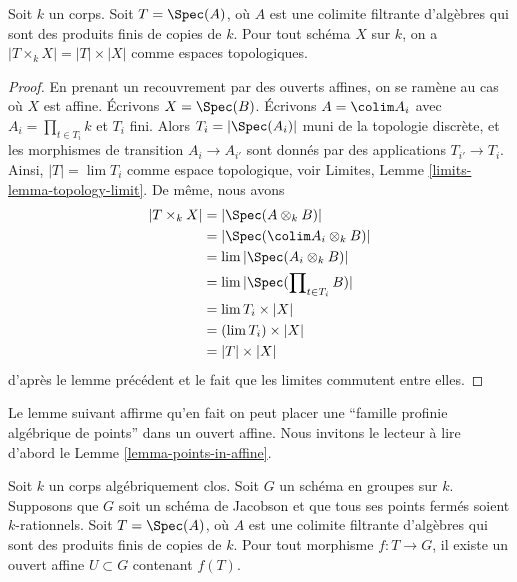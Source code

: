 \begin{lemma}
\label{lemma-profinite-product-over-field}
Soit $k$ un corps. Soit $T = \Spec(A)$, où $A$ est une colimite filtrante
d'algèbres qui sont des produits finis de copies de $k$. Pour tout schéma $X$
sur $k$, on a $|T \times_k X| = |T| \times |X|$ comme espaces topologiques.
\end{lemma}

\begin{proof}
En prenant un recouvrement par des ouverts affines, on se ramène au cas où $X$ est affine.
Écrivons $X = \Spec(B)$.
Écrivons $A = \colim A_i$ avec $A_i = \prod_{t \in T_i} k$ et $T_i$ fini.
Alors $T_i = |\Spec(A_i)|$ muni de la topologie discrète, et les morphismes
de transition $A_i \to A_{i'}$ sont donnés par des applications $T_{i'} \to T_i$. Ainsi,
$|T| = \lim T_i$ comme espace topologique, voir
Limites, Lemme \ref{limits-lemma-topology-limit}. De même, nous avons
\begin{align*}
|T \times_k X| & =
|\Spec(A \otimes_k B)| \\
& =
|\Spec(\colim A_i \otimes_k B)| \\
& =
\lim |\Spec(A_i \otimes_k B)| \\
& =
\lim |\Spec(\prod\nolimits_{t \in T_i} B)| \\
& =
\lim T_i \times |X| \\
& =
(\lim T_i) \times |X| \\
& =
|T| \times |X|
\end{align*}
d'après le lemme précédent et le fait que les limites commutent entre elles.
\end{proof}

\noindent
Le lemme suivant affirme qu'en fait on peut placer une
``famille profinie algébrique de points'' dans un ouvert affine.
Nous invitons le lecteur à lire d'abord le Lemme \ref{lemma-points-in-affine}.

\begin{lemma}
\label{lemma-compact-set-in-affine}
Soit $k$ un corps algébriquement clos. Soit $G$ un schéma en groupes sur $k$.
Supposons que $G$ soit un schéma de Jacobson et que tous ses points fermés soient $k$-rationnels.
Soit $T = \Spec(A)$, où $A$ est une colimite filtrante d'algèbres qui
sont des produits finis de copies de $k$. Pour tout morphisme $f : T \to G$,
il existe un ouvert affine $U \subset G$ contenant $f(T)$.
\end{lemma}

